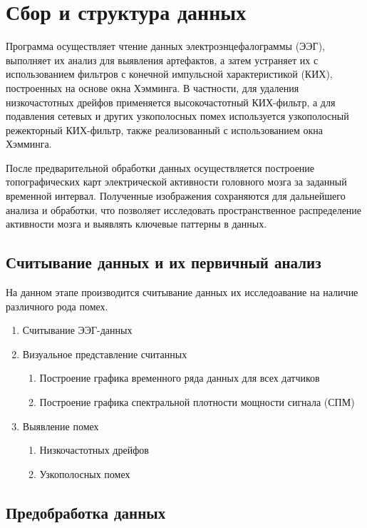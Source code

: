 \chapter{Сбор и структура данных}
\label{ch:chap1}

    Программа осуществляет чтение данных электроэнцефалограммы (ЭЭГ), выполняет их анализ для выявления артефактов, а затем устраняет их с использованием фильтров с конечной импульсной характеристикой (КИХ), построенных на основе окна Хэмминга. В частности, для удаления низкочастотных дрейфов применяется высокочастотный КИХ-фильтр, а для подавления сетевых и других узкополосных помех используется узкополосный режекторный КИХ-фильтр, также реализованный с использованием окна Хэмминга.

    После предварительной обработки данных осуществляется построение топографических карт электрической активности головного мозга за заданный временной интервал. Полученные изображения сохраняются для дальнейшего анализа и обработки, что позволяет исследовать пространственное распределение активности мозга и выявлять ключевые паттерны в данных.

\section{Считывание данных и их первичный анализ}
    На данном этапе производится считывание данных их исследоавание на наличие различного рода помех.
    \begin{enumerate}
        \item Считывание ЭЭГ-данных
        \item Визуальное представление считанных
        \begin{enumerate}
            \item Построение графика временного ряда данных для всех датчиков
            \item Построение графика спектральной плотности мощности сигнала (СПМ)
        \end{enumerate}
        \item Выявление помех
        \begin{enumerate}
            \item Низкочастотных дрейфов
            \item Узкополосных помех
        \end{enumerate}
    \end{enumerate}

\section{Предобработка данных}

